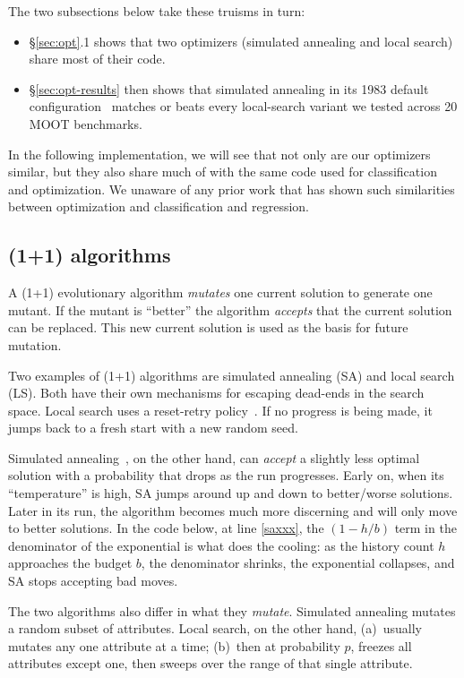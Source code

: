 \documentclass[AMA,STIX2COL]{WileyNJDv5}
\begin{document}
The two subsections below take
these truisms in turn:
\begin{itemize}
\item
\S\ref{sec:opt}.1 shows that two optimizers (simulated
annealing and local search) share most of their code.
\item
\S\ref{sec:opt-results} then shows that simulated annealing in
its 1983 default configuration~\cite{kirkpatrick1983optimization}
matches or beats every local-search variant we tested across 20
MOOT benchmarks.
\end{itemize}
In the following implementation,  we will see  that  not only are our optimizers similar, but
they also share much of
with the same code used for classification and optimization. 
We unaware of any prior work that has shown such similarities
between optimization and classification and regression.

\subsection{(1+1) algorithms}
A (1+1) evolutionary algorithm {\em mutates} one current solution
to generate one mutant. If the mutant is ``better'' the algorithm
{\em accepts} that the current solution can be replaced. This new
current solution is used as the basis for future mutation.

Two examples of (1+1) algorithms are simulated annealing (SA) and
local search (LS). Both have their own mechanisms for escaping
dead-ends in the search space. 
Local search uses  a reset-retry policy~\cite{Crawford:1994}.
If no progress is being made, it jumps back to a fresh start with a  new random seed.

Simulated annealing~\cite{kirkpatrick1983optimization}, on the other hand, can {\em accept}
a slightly less optimal solution with a probability that drops as
the run progresses. Early on, when its ``temperature'' is high, 
SA jumps around up and down to better/worse solutions.
Later in its run, the algorithm
becomes much more discerning and will only move to better solutions.  
In the code below,
at line \ref{saxxx}, the $(1-h/b)$ term in the
denominator of the exponential is what does the cooling: as the
history count $h$ approaches the budget $b$, the denominator
shrinks, the exponential collapses, and SA stops accepting bad
moves.


The two algorithms also differ in what they {\em mutate}. Simulated
annealing mutates a random subset of attributes. Local search, on the other hand,
(a)~usually mutates any one attribute at a time; (b)~then at
probability $p$, freezes all attributes except one, then sweeps over the range
of that single attribute.
\end{document}
